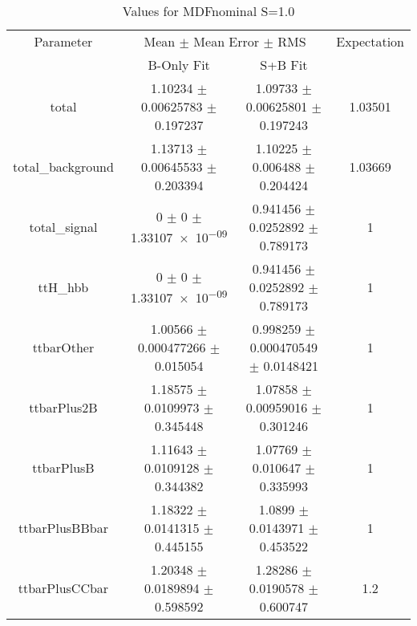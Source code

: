 \begin{table}
\centering
\caption{Values for MDFnominal S=1.0}
\begin{tabular}{cccc}
\toprule
Parameter & \multicolumn{2}{c}{Mean $\pm$ Mean Error $\pm$ RMS} & Expectation\\
 & B-Only Fit & S+B Fit & \\
\midrule
total & \num{1.10234} $\pm$ \num{0.00625783} $\pm$ \num{0.197237} & \num{1.09733} $\pm$ \num{0.00625801} $\pm$ \num{0.197243} & \num{1.03501}\\
total\_background & \num{1.13713} $\pm$ \num{0.00645533} $\pm$ \num{0.203394} & \num{1.10225} $\pm$ \num{0.006488} $\pm$ \num{0.204424} & \num{1.03669}\\
total\_signal & \num{0} $\pm$ \num{0} $\pm$ \num{1.33107e-09} & \num{0.941456} $\pm$ \num{0.0252892} $\pm$ \num{0.789173} & \num{1}\\
ttH\_hbb & \num{0} $\pm$ \num{0} $\pm$ \num{1.33107e-09} & \num{0.941456} $\pm$ \num{0.0252892} $\pm$ \num{0.789173} & \num{1}\\
ttbarOther & \num{1.00566} $\pm$ \num{0.000477266} $\pm$ \num{0.015054} & \num{0.998259} $\pm$ \num{0.000470549} $\pm$ \num{0.0148421} & \num{1}\\
ttbarPlus2B & \num{1.18575} $\pm$ \num{0.0109973} $\pm$ \num{0.345448} & \num{1.07858} $\pm$ \num{0.00959016} $\pm$ \num{0.301246} & \num{1}\\
ttbarPlusB & \num{1.11643} $\pm$ \num{0.0109128} $\pm$ \num{0.344382} & \num{1.07769} $\pm$ \num{0.010647} $\pm$ \num{0.335993} & \num{1}\\
ttbarPlusBBbar & \num{1.18322} $\pm$ \num{0.0141315} $\pm$ \num{0.445155} & \num{1.0899} $\pm$ \num{0.0143971} $\pm$ \num{0.453522} & \num{1}\\
ttbarPlusCCbar & \num{1.20348} $\pm$ \num{0.0189894} $\pm$ \num{0.598592} & \num{1.28286} $\pm$ \num{0.0190578} $\pm$ \num{0.600747} & \num{1.2}\\
\bottomrule
\end{tabular}
\end{table}